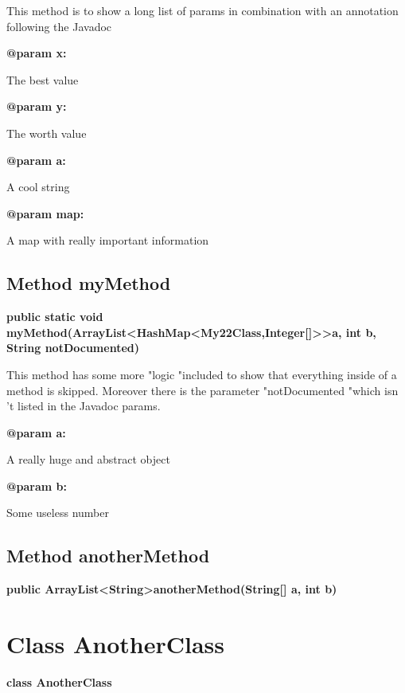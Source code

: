 \documentclass[12pt]{scrreprt}
\begin{document}
This method is to show a long list of params in combination with an annotation following the Javadoc



\textbf{@param x:}

\quad\quad The best value

\textbf{@param y:}

\quad\quad The worth value

\textbf{@param a:}

\quad\quad A cool string

\textbf{@param map:}

\quad\quad A map with really important information



\section{Method myMethod}
\label{examples.SimpleExample:myMethod}




\textbf{public static void myMethod(ArrayList\textless HashMap\textless My22Class,Integer[]\textgreater \textgreater  a, int b, String notDocumented)}


This method has some more "logic "included to show that everything inside of a method is skipped. Moreover there is the parameter "notDocumented "which isn 't listed in the Javadoc params.



\textbf{@param a:}

\quad\quad A really huge and abstract object

\textbf{@param b:}

\quad\quad Some useless number



\section{Method anotherMethod}
\label{examples.SimpleExample:anotherMethod}




\textbf{public ArrayList\textless String\textgreater  anotherMethod(String[] a, int b)}








\chapter{Class AnotherClass}
\label{examples.AnotherClass}




\textbf{class AnotherClass}
\end{document}
